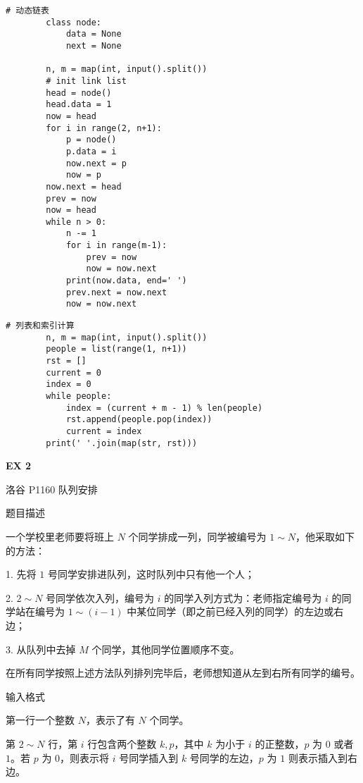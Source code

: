 \documentclass{ctexart}
\begin{document}
\begin{sloppy}
    \begin{lstlisting}[style = Python]
        # 动态链表
        class node:
            data = None
            next = None
        
        n, m = map(int, input().split())
        # init link list
        head = node()
        head.data = 1
        now = head
        for i in range(2, n+1):
            p = node()
            p.data = i
            now.next = p
            now = p
        now.next = head
        prev = now
        now = head
        while n > 0:
            n -= 1
            for i in range(m-1):
                prev = now
                now = now.next
            print(now.data, end=' ')
            prev.next = now.next
            now = now.next
    \end{lstlisting}

    \begin{lstlisting}[style = Python]
        # 列表和索引计算
        n, m = map(int, input().split())
        people = list(range(1, n+1))
        rst = []
        current = 0
        index = 0
        while people:
            index = (current + m - 1) % len(people)
            rst.append(people.pop(index))
            current = index
        print(' '.join(map(str, rst)))
    \end{lstlisting}

    \textbf{EX 2}

    \begin{markdown}
    洛谷 P1160 队列安排

    题目描述

    一个学校里老师要将班上 $N$ 个同学排成一列，同学被编号为 $1\sim N$，他采取如下的方法：

    1. 先将 $1$ 号同学安排进队列，这时队列中只有他一个人；

    2. $2\sim N$ 号同学依次入列，编号为 $i$ 的同学入列方式为：老师指定编号为 $i$ 的同学站在编号为 $1\sim(i-1)$ 中某位同学（即之前已经入列的同学）的左边或右边；

    3. 从队列中去掉 $M$ 个同学，其他同学位置顺序不变。

    在所有同学按照上述方法队列排列完毕后，老师想知道从左到右所有同学的编号。

    输入格式

    第一行一个整数 $N$，表示了有 $N$ 个同学。

    第 $2\sim N$ 行，第 $i$ 行包含两个整数 $k,p$，其中 $k$ 为小于 $i$ 的正整数，$p$ 为 $0$ 或者 $1$。若 $p$ 为 $0$，则表示将 $i$ 号同学插入到 $k$ 号同学的左边，$p$ 为 $1$ 则表示插入到右边。


\end{markdown}
\end{sloppy}
\end{document}
